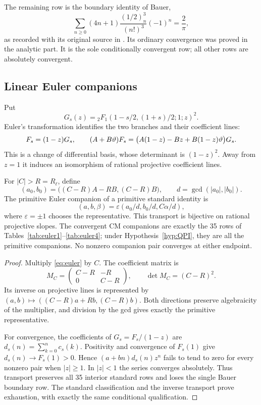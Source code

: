The remaining row is the boundary identity of Bauer,
\[
 \sum_{n\ge0}(4n+1)\frac{(1/2)_n^3}{(n!)^3}(-1)^n
       =\frac2\pi,
\]
as recorded with its original source in
\cite[Section~4.1 and Table~11]{CCY}.  Its ordinary convergence
was proved in the analytic part.  It is the sole conditionally
convergent row; all other rows are absolutely convergent.

\subsection{Linear Euler companions}\label{sec:euler}

Put
\[
 G_s(z)={}_2F_1(1-s/2,(1+s)/2;1;z)^2.
\]
Euler's transformation identifies the two branches and their
coefficient lines:
\begin{equation}\label{eq:euler}
 F_s=(1-z)G_s,\qquad
 (A+B\vartheta)F_s
   =\bigl(A(1-z)-Bz+B(1-z)\vartheta\bigr)G_s.
\end{equation}
This is a change of differential basis, whose determinant is
$(1-z)^2$.  Away from $z=1$ it induces an isomorphism of rational
projective coefficient lines.

\begin{theorem}\label{thm:euler}
For $|C|>R=R_\ell$, define
\[
 (a_0,b_0)=\bigl((C-R)A-RB,(C-R)B\bigr),\qquad
 d=\gcd(|a_0|,|b_0|).
\]
The primitive Euler companion of a primitive standard identity is
\[
                  (a,b,\beta)=\varepsilon
                  (a_0/d,b_0/d,C\alpha/d),
\]
where $\varepsilon=\pm1$ chooses the representative.  This
transport is bijective on rational projective slopes.  The
convergent CM companions are exactly the 35 rows of
Tables~\ref{tab:euler1}--\ref{tab:euler4}; under
Hypothesis~\ref{hyp:QPI}, they are all the primitive companions.
No nonzero companion pair converges at either endpoint.
\end{theorem}
\begin{proof}
Multiply \eqref{eq:euler} by $C$.  The coefficient matrix is
\[
 M_C=\begin{pmatrix}C-R&-R\\0&C-R\end{pmatrix},
 \qquad \det M_C=(C-R)^2.
\]
Its inverse on projective lines is represented by
$(a,b)\mapsto((C-R)a+Rb,(C-R)b)$.  Both directions preserve
algebraicity of the multiplier, and division by the gcd gives
exactly the primitive representative.

For convergence, the coefficients of $G_s=F_s/(1-z)$ are
$d_s(n)=\sum_{k=0}^n c_s(k)$.  Positivity and convergence of
$F_s(1)$ give $d_s(n)\to F_s(1)>0$.  Hence
$(a+bn)d_s(n)z^n$ fails to tend to zero for every nonzero pair
when $|z|\ge1$.  In $|z|<1$ the series converges absolutely.
Thus transport preserves all 35 interior standard rows and loses
the single Bauer boundary row.  The standard classification and
the inverse transport prove exhaustion, with exactly the same
conditional qualification.
\end{proof}
